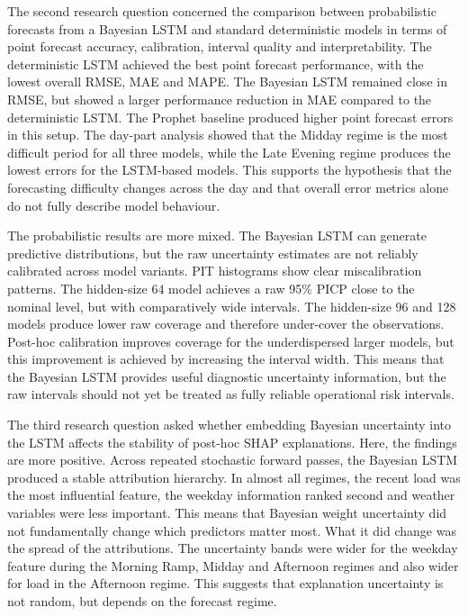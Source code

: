 \documentclass[Master,english,IEEE]{twbook}
\begin{document}
The second research question concerned the comparison between probabilistic forecasts from a Bayesian LSTM and standard deterministic models in terms of point forecast accuracy, calibration, interval quality and interpretability. The deterministic LSTM achieved the best point forecast performance, with the lowest overall RMSE, MAE and MAPE. The Bayesian LSTM remained close in RMSE, but showed a larger performance reduction in MAE compared to the deterministic LSTM. The Prophet baseline produced higher point forecast errors in this setup. The day-part analysis showed that the Midday regime is the most difficult period for all three models, while the Late Evening regime produces the lowest errors for the LSTM-based models. This supports the hypothesis that the forecasting difficulty changes across the day and that overall error metrics alone do not fully describe model behaviour.

The probabilistic results are more mixed. The Bayesian LSTM can generate predictive distributions, but the raw uncertainty estimates are not reliably calibrated across model variants. PIT histograms show clear miscalibration patterns. The hidden-size 64 model achieves a raw 95\% PICP close to the nominal level, but with comparatively wide intervals. The hidden-size 96 and 128 models produce lower raw coverage and therefore under-cover the observations. Post-hoc calibration improves coverage for the underdispersed larger models, but this improvement is achieved by increasing the interval width. This means that the Bayesian LSTM provides useful diagnostic uncertainty information, but the raw intervals should not yet be treated as fully reliable operational risk intervals.


The third research question asked whether embedding Bayesian uncertainty into the LSTM affects the stability of post-hoc SHAP explanations. Here, the findings are more positive. Across repeated stochastic forward passes, the Bayesian LSTM produced a stable attribution hierarchy. In almost all regimes, the recent load was the most influential feature, the weekday information ranked second and weather variables were less important. This means that Bayesian weight uncertainty did not fundamentally change which predictors matter most.  What it did change was the spread of the attributions. The uncertainty bands were wider for the weekday feature during the Morning Ramp, Midday and Afternoon regimes and also wider for load in the Afternoon regime. This suggests that explanation uncertainty is not random, but depends on the forecast regime. 
\end{document}
